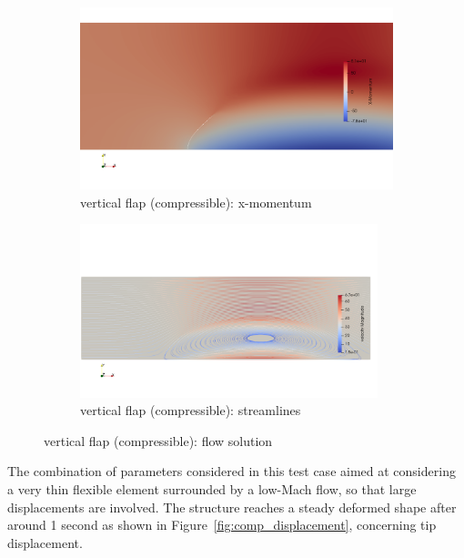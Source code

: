 \begin{figure}[htbp!]
	\centering
	\begin{subfigure}{0.9\textwidth}
	\centering
	\includegraphics[width=\textwidth, trim=0 150 0 150, clip]{images/comp_flap/x-mom.png}
	\caption{vertical flap (compressible): x-momentum}
	\end{subfigure}
	\begin{subfigure}{\textwidth}
	\centering
	\includegraphics[width=0.95\textwidth, trim=0 150 0 150, clip]{images/comp_flap/vel-stream.png}
	\caption{vertical flap (compressible): streamlines}
	\end{subfigure}
	\caption{vertical flap (compressible): flow solution}
	\label{fig:comp_sol}
\end{figure}


The combination of parameters considered in this test case aimed at considering a very thin flexible element surrounded by a low-Mach flow, so that large displacements are involved. The structure reaches a steady deformed shape after around 1 second as shown in Figure~\ref{fig:comp_displacement}, concerning tip displacement. 

